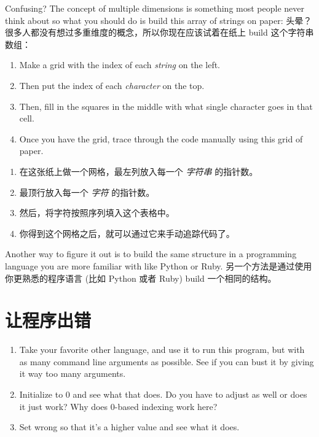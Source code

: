 Confusing? The concept of multiple dimensions is something most
people never think about so what you should do is build this
array of strings on paper:
头晕？很多人都没有想过多重维度的概念，所以你现在应该试着在纸上 build 这个字符串数组：

\begin{enumerate}
\item Make a grid with the index of each \emph{string} on the left.
\item Then put the index of each \emph{character} on the top.
\item Then, fill in the squares in the middle with what single character
    goes in that cell.
\item Once you have the grid, trace through the code manually
    using this grid of paper.
\end{enumerate}

\begin{enumerate}
\item 在这张纸上做一个网格，最左列放入每一个 \emph{字符串} 的指针数。
\item 最顶行放入每一个 \emph{字符} 的指针数。
\item 然后，将字符按照序列填入这个表格中。
\item 你得到这个网格之后，就可以通过它来手动追踪代码了。
\end{enumerate}

Another way to figure it out is to build the same structure
in a programming language you are more familiar with like Python or
Ruby.
另一个方法是通过使用你更熟悉的程序语言 (比如 Python 或者 Ruby) build 一个相同的结构。

\section{让程序出错}

\begin{enumerate}
\item Take your favorite other language, and use it to run this program, but
    with as many command line arguments as possible.  See if you can bust it
    by giving it way too many arguments.
\item Initialize  to 0 and see what that does.  Do you have to adjust
     as well or does it just work?  Why does 0-based indexing work
    here?
\item Set  wrong so that it's a higher value and see what
    it does.
\end{enumerate}

